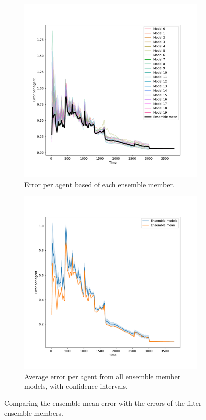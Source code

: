 \documentclass{article}
\begin{document}
\begin{figure}[htbp]
	\centering
	\begin{subfigure}[ht]{0.49\textwidth}
		\includegraphics[width=\textwidth]{figures/exp1/lineplot.pdf}
		\caption{Error per agent based of each ensemble member.}\label{fig:gcs_line}
	\end{subfigure}
    \hfill
	\begin{subfigure}[ht]{0.49\textwidth}
	\includegraphics[width=\textwidth]{figures/exp1/lineplot_ci.pdf}
	\caption{Average error per agent from all ensemble member models, with confidence intervals.}\label{fig:gcs_line_ci}
	\end{subfigure}

	\caption{Comparing the ensemble mean error with the errors of the filter ensemble members.}\label{fig:gcs_lines}
\end{figure}
\end{document}
